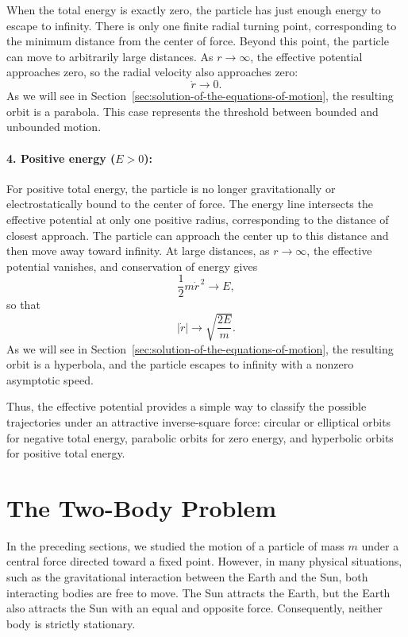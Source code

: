 \documentclass[12pt]{article}
\begin{document}
When the total energy is exactly zero, the particle has
just enough energy to escape to infinity. There is only one finite radial turning point, corresponding to the minimum distance from the center of force. Beyond this point, the particle can move to arbitrarily large distances. As $r\to\infty$, the effective potential approaches zero, so the radial velocity also approaches zero:
\[
    \dot{r}\to 0.
\]
As we will see in Section~\ref{sec:solution-of-the-equations-of-motion}, the resulting orbit is a parabola. This case represents the threshold between bounded and unbounded motion.

\paragraph{4. Positive energy ($E>0$):}

For positive total energy, the particle is no longer gravitationally or electrostatically bound to the center of force. The energy line intersects the effective potential at only one positive radius, corresponding to the distance of closest approach. The particle can approach the center up to this distance and then move away toward infinity. At large distances, as $r\to\infty$, the effective potential vanishes, and conservation of energy gives
\[
    \frac{1}{2}m\dot{r}^{\,2}\to E,
\]
so that
\[
    |\dot{r}|\to\sqrt{\frac{2E}{m}}.
\]
As we will see in Section~\ref{sec:solution-of-the-equations-of-motion}, the resulting orbit is a hyperbola, and the particle escapes to infinity with a nonzero asymptotic speed.

Thus, the effective potential provides a simple way to
classify the possible trajectories under an attractive
inverse-square force: circular or elliptical orbits for
negative total energy, parabolic orbits for zero energy,
and hyperbolic orbits for positive total energy.



\section{The Two-Body Problem}
\label{sec:two-body-problem}

In the preceding sections, we studied the motion of a particle of mass $m$ under a central force directed toward a fixed point. However, in many physical situations, such as the gravitational interaction between the Earth and the Sun, both interacting bodies are free to move. The Sun attracts the Earth, but the Earth also attracts the Sun with an equal and opposite force. Consequently, neither body is strictly stationary.
\end{document}
